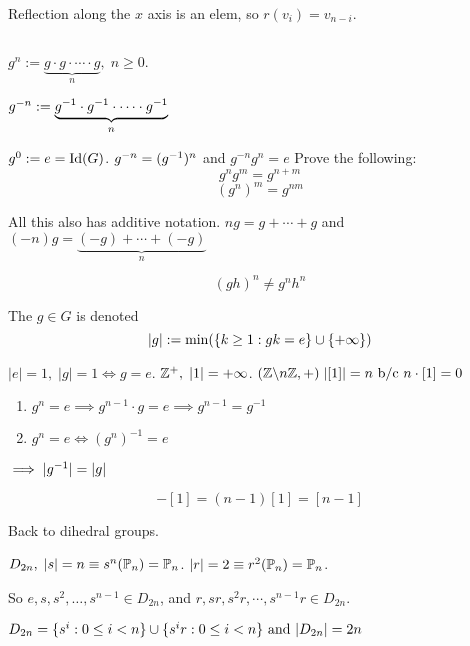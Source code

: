 \documentclass[12pt]{article}
\begin{document}
Reflection along the \(x\) axis is an elem, so \(r(v_i)=v_{n-i}\).


\bbox
\begin{defn}\label{defn:group_power}
  \(\,\)

  \(g^n:=\underset n{\underbrace{g\cdot g\cdot \cdots \cdot g}},\;n\ge 0\).

  \(g^{-n}:=\underset n{\underbrace{g^{-1}\cdot g^{-1}\cdot\cdots\cdot g^{-1}}}\)

  \(g^0:=e=\mathrm{Id}(G)\).
  \bboxnote {}
  \(g^{-n}=(g^{-1})^n\) and
  \(g^{-n}g^n=e\) Prove the following:
  \[g^ng^m=g^{n+m}\]
  \[(g^n)^m=g^{nm}\]
  \ebox
\end{defn}
\ebox

All this also has additive notation.
\(ng=g+\cdots+g\) and
\((-n)g=\underset n{\underbrace{(-g)+\cdots+(-g)}}\)


\bboxnote
{} 
\[(gh)^n\neq g^nh^n\]
\ebox


\bbox
\begin{defn}\label{defn:order_of_and_elem}
  The  \(g\in G\) is denoted
  \[|g|:=\mathrm{min}(\{k\ge 1:gk=e\}\cup\{+\infty\})\]
\end{defn}
\ebox

\bboxex
{} \(|e|=1,\;|g|=1\iff g=e\).
\(\mathbb Z^+,\;|1|=+\infty\). 
\((\mathbb Z\backslash n\mathbb Z,+)\;|[1]|=n\text{ b/c }
n\cdot[1]=0\)
\ebox

\bbox
\begin{lem}\label{lem:prop_of_order}
  \begin{enumerate}
    \item \(g^n=e\implies g^{n-1}\cdot g=e\implies g^{n-1}=g^{-1}\)
    \item \(g^n=e\iff(g^n)^{-1}=e\)
  \end{enumerate}
  \(\implies|g^{-1}|=|g|\)
\end{lem}
\ebox


\bboxex
{}
\[-[1]=(n-1)[1]=[n-1]\]
\ebox

Back to dihedral groups.

\(D_{2n},\;|s|=n\equiv s^n(\mathbb P_n)=\mathbb P_n\).
\(|r|=2\equiv r^2(\mathbb P_n)=\mathbb P_n\).

So \(e,s,s^2,\dots,s^{n-1}\in D_{2n}\),
and \(r,sr,s^2r,\cdots,s^{n-1}r\in D_{2n}\).


\bbox
\begin{prop}\label{prop:dihedral_group_explicit_classification}
  \(D_{2n}=
  \{s^i:0\le i<n\}\cup
  \{s^ir:0\le i<n\}\text{ and }
  |D_{2n}|=2n\)
\end{prop}
\ebox
\end{document}
